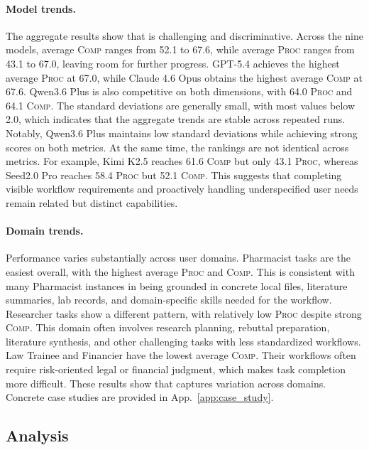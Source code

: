 \paragraph{Model trends.}
The aggregate results show that {\bench} is challenging and discriminative. Across the nine models, average \textsc{Comp} ranges from 52.1 to 67.6, while average \textsc{Proc} ranges from 43.1 to 67.0, leaving room for further progress. GPT-5.4 achieves the highest average \textsc{Proc} at 67.0, while Claude 4.6 Opus obtains the highest average \textsc{Comp} at 67.6. Qwen3.6 Plus is also competitive on both dimensions, with 64.0 \textsc{Proc} and 64.1 \textsc{Comp}. The standard deviations are generally small, with most values below 2.0, which indicates that the aggregate trends are stable across repeated runs. Notably, Qwen3.6 Plus maintains low standard deviations while achieving strong scores on both metrics. At the same time, the rankings are not identical across metrics. For example, Kimi K2.5 reaches 61.6 \textsc{Comp} but only 43.1 \textsc{Proc}, whereas Seed2.0 Pro reaches 58.4 \textsc{Proc} but 52.1 \textsc{Comp}. This suggests that completing visible workflow requirements and proactively handling underspecified user needs remain related but distinct capabilities.

\paragraph{Domain trends.}
Performance varies substantially across user domains. Pharmacist tasks are the easiest overall, with the highest average \textsc{Proc} and \textsc{Comp}. This is consistent with many Pharmacist instances in {\bench} being grounded in concrete local files, literature summaries, lab records, and domain-specific skills needed for the workflow. Researcher tasks show a different pattern, with relatively low \textsc{Proc} despite strong \textsc{Comp}. This domain often involves research planning, rebuttal preparation, literature synthesis, and other challenging tasks with less standardized workflows. Law Trainee and Financier have the lowest average \textsc{Comp}. Their workflows often require risk-oriented legal or financial judgment, which makes task completion more difficult. These results show that {\bench} captures variation across domains. Concrete case studies are provided in App.~\ref{app:case_study}.

\subsection{Analysis}
\label{sec:analysis}

